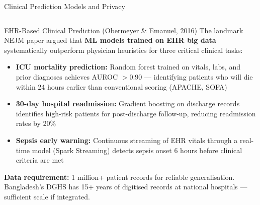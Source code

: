 \documentclass[aspectratio=169,10pt]{beamer}
\begin{document}
\begin{frame}{Clinical Prediction Models and Privacy}
  \begin{columns}[T]
      \begin{block}{EHR-Based Clinical Prediction (Obermeyer \& Emanuel, 2016)}
        The landmark NEJM paper argued that \textbf{ML models trained on EHR big data} systematically outperform physician heuristics for three critical clinical tasks:
        \vspace{4pt}
        \begin{itemize}
          \item \textbf{ICU mortality prediction:}  Random forest trained on vitals, labs, and prior diagnoses achieves AUROC $>0.90$ --- identifying patients who will die within 24 hours earlier than conventional scoring (APACHE, SOFA)
          \item \textbf{30-day hospital readmission:}  Gradient boosting on discharge records identifies high-risk patients for post-discharge follow-up, reducing readmission rates by 20\%
          \item \textbf{Sepsis early warning:}  Continuous streaming of EHR vitals through a real-time model (Spark Streaming) detects sepsis onset 6 hours before clinical criteria are met
        \end{itemize}
        \vspace{4pt}
        \textbf{Data requirement:}  1 million+ patient records for reliable generalisation.  Bangladesh's DGHS has 15+ years of digitised records at national hospitals --- sufficient scale if integrated.
      \end{block}


\end{columns}
\end{frame}
\end{document}
